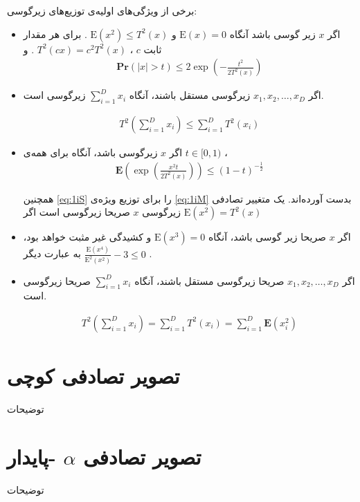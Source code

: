 برخی از ویژگی‌های اولیه‌ی توزیع‌های زیرگوسی:

\begin{itemize}
\item
اگر 
$x$
زیر گوسی باشد آنگاه 
$\mathrm{E}(x) = 0$
و 
$\mathrm{E}(x^2) \leq T^2(x)$
. برای هر مقدار ثابت 
$c$
، 
$T^2(cx) = c^2T^2(x)$
. و
\begin{align}
\mathbf{Pr}(|x| > t) \leq 2 \exp \left( - \frac{t^2}{2T^2(x)} \right)
\label{eq:1iQ}
\end{align}
\item
اگر 
$x_1, x_2, \ldots, x_D$
زیرگوسی مستقل باشند، آنگاه
$\sum_{i=1}^D x_i$
زیرگوسی است.

\begin{align}
T^2 \left( \sum_{i=1}^D x_i \right) \leq \sum_{i=1}^D T^2(x_i)
\label{eq:1iR}
\end{align}
\item
اگر 
$x$
زیرگوسی باشد، آنگاه برای همه‌ی 
$t \in [0,1)$
،
\begin{align}
\mathbf{E} \left( \exp \left( \frac{x^2 t}{2 T^2(x)} \right) \right) \leq (1-t)^{- \frac{1}{2}}
\label{eq:1iS}
\end{align}

\cite{litez2, litez3}
همچنین 
\autoref{eq:1iS}
را برای توزیع ویژه‌ی
\autoref{eq:1iM}
بدست آورده‌اند. یک متغییر تصادفی زیرگوسی
$x$
صریحا زیرگوسی است اگر 
$\mathrm{E}(x^2) = T^2(x)$
\item
اگر 
$x$
صریحا زیر گوسی باشد، آنگاه 
‌$\mathrm{E}(x^3)=0$
و کشیدگی
غیر مثبت خواهد بود، به عبارت دیگر 
$\frac{\mathrm{E}(x^4)}{\mathrm{E}^2(x^2)} - 3 \leq 0$
.
\item
اگر
$x_1, x_2, \ldots, x_D$
صریحا زیرگوسی مستقل باشند، آنگاه
$\sum_{i=1}^D x_i$
صریحا زیرگوسی است.

\begin{align}
T^2 \left( \sum_{i=1}^D x_i \right) = \sum_{i=1}^D T^2(x_i)
= \sum_{i=1}^D \mathbf{E} \left( x_i^2 \right)
\label{eq:1iR}
\end{align}
\end{itemize}



\section{
تصویر تصادفی کوچی
}
توضیحات
\section{
تصویر تصادفی 
$\alpha$
-پایدار
}
توضیحات
